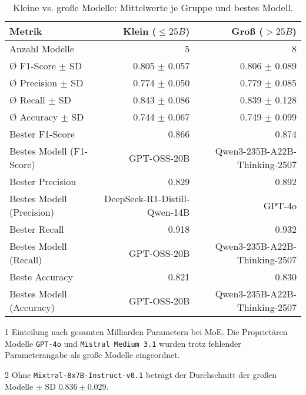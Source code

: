 \begin{table}[htbp]
 \centering
 \caption{Kleine vs. große Modelle: Mittelwerte je Gruppe und bestes Modell.}
 \label{tab:small-vs-large}
 \begin{adjustbox}{width=\textwidth}
  \begin{threeparttable}[width=\textwidth]
   \begin{tabular}[width=\textwidth]{l r r}
    \toprule
    \textbf{Metrik} & \textbf{Klein} ($\leq 25B$) & \textbf{Groß} ($> 25B$) \\
    \midrule
    Anzahl Modelle\tnote{1}             & 5                         & 8 \\
    Ø F1-Score $\pm$ SD\tnote{2}      & 0.805 $\pm$ 0.057                     & 0.806 $\pm$ 0.089 \\
    Ø Precision $\pm$ SD    & 0.774 $\pm$ 0.050                     & 0.779 $\pm$ 0.085 \\
    Ø Recall $\pm$ SD       & 0.843 $\pm$ 0.086                     & 0.839 $\pm$ 0.128 \\
    Ø Accuracy $\pm$ SD     & 0.744 $\pm$ 0.067                     & 0.749 $\pm$ 0.099 \\
    Bester F1-Score & 0.866                     & 0.874 \\
    Bestes Modell (F1-Score)   & GPT-OSS-20B               & Qwen3-235B-A22B-Thinking-2507 \\
    Bester Precision & 0.829                     & 0.892 \\
    Bestes Modell (Precision) & DeepSeek-R1-Distill-Qwen-14B        & GPT-4o \\
    Bester Recall & 0.918                     & 0.932 \\
    Bestes Modell (Recall)      & GPT-OSS-20B      & Qwen3-235B-A22B-Thinking-2507 \\
    Beste Accuracy & 0.821                     & 0.830 \\
    Bestes Modell (Accuracy)     & GPT-OSS-20B               & Qwen3-235B-A22B-Thinking-2507 \\
    \bottomrule
   \end{tabular}
   \begin{tablenotes}
    \footnotesize
    \item[1] Einteilung nach gesamten Milliarden Parametern bei \ac{MoE}. Die Proprietären Modelle \texttt{GPT-4o} und \texttt{Mistral Medium 3.1} wurden trotz fehlender Parameterangabe als große Modelle eingeordnet.
    \item[2] Ohne \texttt{Mixtral-8x7B-Instruct-v0.1} beträgt der Durchschnitt der großen Modelle $\pm$ SD $0.836 \pm 0.029$.
   \end{tablenotes}
  \end{threeparttable}
 \end{adjustbox}
\end{table}

